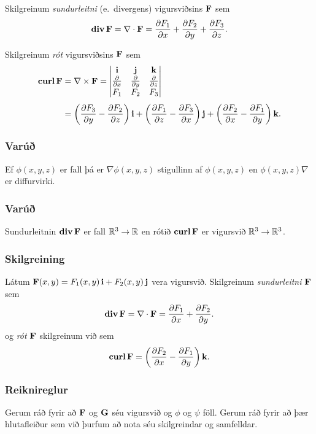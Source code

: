 Skilgreinum {\em sundurleitni} (e.~divergens) vigursviðsins $\mbox{${\bf F}$}$ sem 
 $$\mbox{${\rm\bf div\,}$}\mbox{${\bf F}$}=\nabla\cdot\mbox{${\bf F}$}=\frac{\partial F_1}{\partial x}+\frac{\partial F_2}{\partial y}+\frac{\partial F_3}{\partial z}.$$

Skilgreinum {\em rót}  vigursviðsins $\mbox{${\bf F}$}$ sem 
 \begin{align*}
 \curl\Fv&=\nabla\times\Fv =\begin{vmatrix} \iv&\jv&\kv\\
 \frac{\partial} {\partial x}&\frac{\partial}{\partial y}&\frac{\partial}{\partial z}\\F_1&F_2&F_3\end{vmatrix} \\
 \noalign{\smallskip}
 &=\bigg(\frac{\partial F_3}{\partial y}-\frac{\partial F_2}{\partial
 z}\bigg)\,\iv+\bigg(\frac{\partial F_1}{\partial z}-\frac{\partial
 F_3}{\partial x}\bigg)\,\jv+\bigg(\frac{\partial F_2}{\partial
 x}-\frac{\partial F_1}{\partial y}\bigg)\,\kv. 
 \end{align*}



\subsubsection{Varúð \rtask{}}
  Ef $\phi(x,y,z)$ er fall þá er $\nabla \phi(x,y,z)$ 
stigullinn af $\phi(x,y,z)$ en $\phi(x,y,z)\nabla$ er diffurvirki.



\subsubsection{Varúð \rtask{}}
 Sundurleitnin $\mbox{${\rm\bf div\,}$}\mbox{${\bf F}$}$ er fall ${\mathbb R}^3\rightarrow{\mathbb R}$ en rótið $\mbox{${\rm\bf curl\,}$}\mbox{${\bf F}$}$ er vigursvið ${\mathbb R}^3\rightarrow{\mathbb R}^3$.



\subsubsection{Skilgreining \rtask{}}
 Látum
$\mbox{${\bf F}$}(x,y)=F_1(x,y)\,\mbox{${\bf i}$}+F_2(x,y)\,\mbox{${\bf j}$}$ vera vigursvið.  Skilgreinum
{\em sundurleitni} $\mbox{${\bf F}$}$ sem  
$$\mbox{${\rm\bf div\,}$}\mbox{${\bf F}$}=\nabla\cdot\mbox{${\bf F}$}=\frac{\partial F_1}{\partial
  x}+\frac{\partial F_2}{\partial y}.$$ 
og {\em rót} $\mbox{${\bf F}$}$ skilgreinum við sem 
$$\mbox{${\rm\bf curl\,}$}\mbox{${\bf F}$}=\bigg(\frac{\partial F_2}{\partial x}-\frac{\partial
  F_1}{\partial y}\bigg)\,\mbox{${\bf k}$}.$$ 




\subsubsection{Reiknireglur \rtask{}}
  Gerum ráð fyrir að $\mbox{${\bf F}$}$ og $\mbox{${\bf G}$}$ séu
vigursvið og $\phi$ og $\psi$ föll.  Gerum ráð fyrir að þær
hlutafleiður sem við þurfum að nota séu skilgreindar og samfelldar. 

